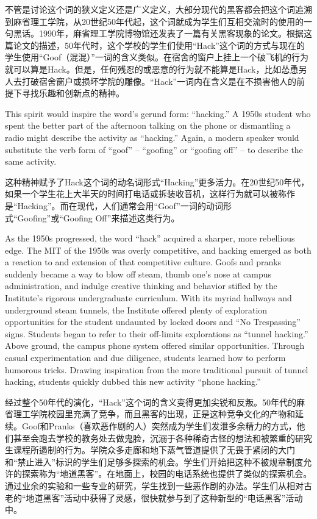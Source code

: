 \ifdefined\chs
不管是讨论这个词的狭义定义还是广义定义，大部分现代的黑客都会把这个词追溯到麻省理工学院，从20世纪50年代起，这个词就成为学生们互相交流时的使用的一句黑话。1990年，麻省理工学院博物馆还发表了一篇有关黑客现象的论文。根据这篇论文的描述，50年代时，这个学校的学生们使用``Hack''这个词的方式与现在的学生使用``Goof（混混）''一词的含义类似。在宿舍的窗户上挂上一个破飞机的行为就可以算是Hack。但是，任何残忍的或恶意的行为就不能算是Hack，比如怂恿另人去打破宿舍窗户或损坏学院的雕像。``Hack''一词内在含义是在不损害他人的前提下寻找乐趣和创新点的精神。
\fi

\ifdefined\eng
This spirit would inspire the word's gerund form: ``hacking.'' A 1950s student who spent the better part of the afternoon talking on the phone or dismantling a radio might describe the activity as ``hacking.'' Again, a modern speaker would substitute the verb form of ``goof'' -- ``goofing'' or ``goofing off'' -- to describe the same activity.
\fi

\ifdefined\chs
这种精神赋予了Hack这个词的动名词形式``Hacking''更多活力。在20世纪50年代，如果一个学生花上大半天的时间打电话或拆装收音机，这样行为就可以被称作是``Hacking''。而在现代，人们通常会用``Goof''一词的动词形式``Goofing''或``Goofing Off''来描述这类行为。
\fi

\ifdefined\eng
As the 1950s progressed, the word ``hack'' acquired a sharper, more rebellious edge. The MIT of the 1950s was overly competitive, and hacking emerged as both a reaction to and extension of that competitive culture. Goofs and pranks suddenly became a way to blow off steam, thumb one's nose at campus administration, and indulge creative thinking and behavior stifled by the Institute's rigorous undergraduate curriculum. With its myriad hallways and underground steam tunnels, the Institute offered plenty of exploration opportunities for the student undaunted by locked doors and ``No Trespassing'' signs. Students began to refer to their off-limits explorations as ``tunnel hacking.'' Above ground, the campus phone system offered similar opportunities. Through casual experimentation and due diligence, students learned how to perform humorous tricks. Drawing inspiration from the more traditional pursuit of tunnel hacking, students quickly dubbed this new activity ``phone hacking.''
\fi

\ifdefined\chs
经过整个50年代的演化，``Hack''这个词的含义变得更加尖锐和反叛。50年代的麻省理工学院校园里充满了竞争，而且黑客的出现，正是这种竞争文化的产物和延续。Goof和Pranks（喜欢恶作剧的人）突然成为学生们发泄多余精力的方式，他们甚至会跑去学校的教务处去做鬼脸，沉溺于各种稀奇古怪的想法和被繁重的研究生课程所遏制的行为。学院众多走廊和地下蒸气管道提供了无畏于紧闭的大门和``禁止进入''标识的学生们足够多探索的机会。学生们开始把这种不被规章制度允许的探索称为``地道黑客''。在地面上，校园的电话系统也提供了类似的探索机会。通过业余的实验和一些专业的研究，学生找到一些恶作剧的办法。学生们从相对古老的``地道黑客''活动中获得了灵感，很快就参与到了这种新型的``电话黑客''活动中。
\fi

